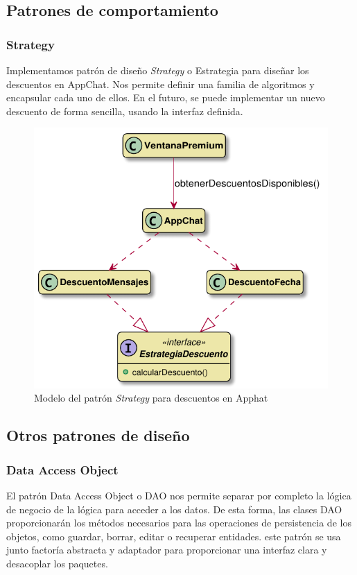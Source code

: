 \documentclass[11pt]{article}
\begin{document}
\clearpage

\subsection{Patrones de comportamiento}

\subsubsection*{Strategy}

Implementamos patrón de diseño \textit{Strategy} o Estrategia para diseñar los descuentos en AppChat. Nos permite definir una familia de algoritmos y encapsular cada uno de ellos. En el futuro, se puede implementar un nuevo descuento de forma sencilla, usando la interfaz definida.

\begin{figure}[H]
	\centering
	\includegraphics[width=0.4\linewidth]{figures/strategy_model}
	\caption{Modelo del patrón \textit{Strategy} para descuentos en Apphat}
	\label{fig:strategy}
\end{figure}

\subsection{Otros patrones de diseño}

\subsubsection{Data Access Object}

El patrón Data Access Object o DAO nos permite separar por completo la lógica de negocio de la lógica para acceder a los datos. De esta forma, las clases DAO proporcionarán los métodos necesarios para las operaciones de persistencia de los objetos, como guardar, borrar, editar o recuperar entidades. este patrón se usa junto factoría abstracta y adaptador para proporcionar una interfaz clara y desacoplar los paquetes.
\end{document}
